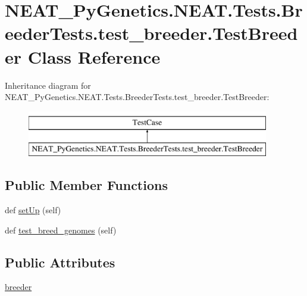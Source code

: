 \hypertarget{classNEAT__PyGenetics_1_1NEAT_1_1Tests_1_1BreederTests_1_1test__breeder_1_1TestBreeder}{}\section{N\+E\+A\+T\+\_\+\+Py\+Genetics.\+N\+E\+A\+T.\+Tests.\+Breeder\+Tests.\+test\+\_\+breeder.\+Test\+Breeder Class Reference}
\label{classNEAT__PyGenetics_1_1NEAT_1_1Tests_1_1BreederTests_1_1test__breeder_1_1TestBreeder}
Inheritance diagram for N\+E\+A\+T\+\_\+\+Py\+Genetics.\+N\+E\+A\+T.\+Tests.\+Breeder\+Tests.\+test\+\_\+breeder.\+Test\+Breeder\+:\begin{figure}[H]
\begin{center}
\leavevmode
\includegraphics[height=2.000000cm]{classNEAT__PyGenetics_1_1NEAT_1_1Tests_1_1BreederTests_1_1test__breeder_1_1TestBreeder}
\end{center}
\end{figure}
\subsection*{Public Member Functions}
\begin{DoxyCompactItemize}
\item 
def \hyperlink{classNEAT__PyGenetics_1_1NEAT_1_1Tests_1_1BreederTests_1_1test__breeder_1_1TestBreeder_a8967d8a2eed942a90b58d7b1201cb46c}{set\+Up} (self)
\item 
def \hyperlink{classNEAT__PyGenetics_1_1NEAT_1_1Tests_1_1BreederTests_1_1test__breeder_1_1TestBreeder_a8595b48bc5d70d810bbe5aa38fc3175f}{test\+\_\+breed\+\_\+genomes} (self)
\end{DoxyCompactItemize}
\subsection*{Public Attributes}
\begin{DoxyCompactItemize}
\item 
\hyperlink{classNEAT__PyGenetics_1_1NEAT_1_1Tests_1_1BreederTests_1_1test__breeder_1_1TestBreeder_abc027b8c1ce451c04c5eae1fe983c40b}{breeder}
\end{DoxyCompactItemize}


